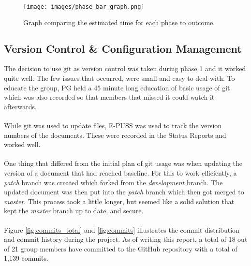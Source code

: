 \documentclass{article}
\begin{document}
        \begin{figure}[!htb]
            \centering
              \texttt{[image: images/phase\_bar\_graph.png]}
              \caption{Graph comparing the estimated time for each phase to outcome. }\label{fig:schedule}
            \endminipage\hfill
        \end{figure}
      
      \subsection{Version Control \& Configuration Management \label{cm}}
        The decision to use git as version control was taken during phase 1
        and it worked quite well. The few issues that occurred, were small and easy to deal with.
        To educate the group, PG held a 45 minute long education of basic usage of git which was also
        recorded so that members that missed it could watch it afterwards.
        \\ \\
        While git was used to update files, E-PUSS was used to track the version numbers
        of the documents. These were recorded in the Status Reports and worked well.
        \\ \\
        One thing that differed from the initial plan of git usage was when updating
        the version of a document that had reached baseline. For this to work efficiently,
        a \emph{patch} branch was created which forked from the \emph{development} branch.
        The updated document was then put into the \emph{patch} branch which then got merged %
        to \emph{master}. This process took a little longer, but seemed like a solid solution that kept the \emph{master} branch up to date, and secure.
        \\ \\
        Figure \ref{fig:commits_total} and \ref{fig:commits} illustrates the commit distribution
        and commit history during the project. As of writing this report, a total of 18 out of 21 group members have committed to the GitHub repository with a total of 1,139 commits.
        
\end{document}
